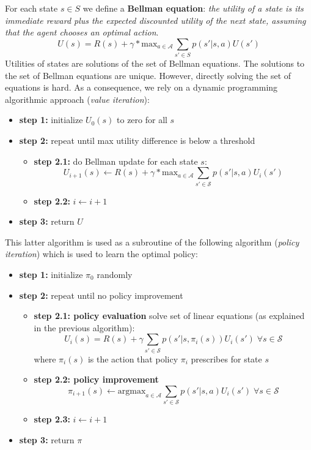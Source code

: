 For each state $s \in S$ we define a \textbf{Bellman equation}: \textit{the utility of a state is its immediate reward plus the expected discounted utility of the next state, assuming that the agent chooses an optimal action}.
\begin{equation}
    U(s) = R(s) + \gamma * \text{max}_{a \in \mathcal{A}} \sum_{s' \in S} p(s' | s,a) U(s')
\end{equation}
Utilities of states are solutions of the set of Bellman equations. The solutions to the set of Bellman equations are unique. However, directly solving the set of equations is hard. As a consequence, we rely on a dynamic programming algorithmic approach (\textit{value iteration}):
\begin{itemize}
    \item \textbf{step 1:} initialize $U_0(s)$ to zero for all $s$
    \item \textbf{step 2:} repeat until max utility difference is below a threshold
    \begin{itemize}
        \item \textbf{step 2.1:} do Bellman update for each state $s$:
        $$U_{i+1}(s) \leftarrow R(s) + \gamma * \text{max}_{a \in \mathcal{A}} \sum_{s' \in \mathcal{S}} p(s'|s,a)U_i(s')$$
        \item \textbf{step 2.2:} $i \leftarrow i+1$
    \end{itemize}
    \item \textbf{step 3:} return $U$
\end{itemize}

This latter algorithm is used as a subroutine of the following algorithm (\textit{policy iteration}) which is used to learn the optimal policy:
\begin{itemize}
    \item \textbf{step 1:} initialize $\pi_0$ randomly
    \item \textbf{step 2:} repeat until no policy improvement
    \begin{itemize}
        \item \textbf{step 2.1: policy evaluation} solve set of linear equations (as explained in the previous algorithm):
        $$U_i(s) = R(s) + \gamma \sum_{s' \in \mathcal{S}} p(s' | s, \pi_i(s))U_i(s') \; \forall s \in \mathcal{S}$$
        where $\pi_i(s)$ is the action that policy $\pi_i$ prescribes for state $s$
        
        \item \textbf{step 2.2: policy improvement}
        $$\pi_{i+1}(s) \leftarrow \text{argmax}_{a \in \mathcal{A}} \sum_{s' \in \mathcal{S}} p(s'|s,a)U_i(s') \; \forall s \in \mathcal{S}$$
        
        \item \textbf{step 2.3:} $i \leftarrow i+1$
    \end{itemize}
    \item \textbf{step 3:} return $\pi$
\end{itemize}

